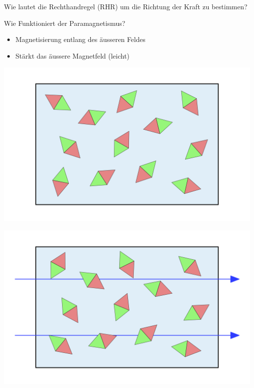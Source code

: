 \begin{karte}{Wie lautet die Rechthandregel (RHR) um die Richtung der Kraft zu bestimmen?}
\begin{karte}{Wie Funktioniert der Paramagnetismus?}
	\begin{itemize}
		\item Magnetisierung entlang des äusseren Feldes
		\item Stärkt das äussere Magnetfeld (leicht)
	\end{itemize}
	\begin{center}
		\begin{minipage}{0.32\textwidth}
			\includegraphics[width=\textwidth]{pics/MS_Paramagnetismus_1.png} %
		\end{minipage}
		\begin{minipage}{0.32\textwidth}
			\includegraphics[width=\textwidth]{pics/MS_Paramagnetismus_2.png} %

\end{minipage}
\end{center}
\end{karte}
\end{karte}

